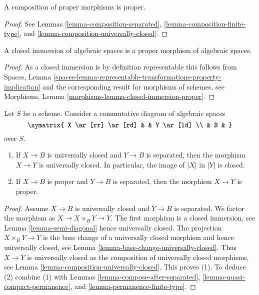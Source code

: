 \begin{lemma}
\label{lemma-composition-proper}
A composition of proper morphisms is proper.
\end{lemma}

\begin{proof}
See
Lemmas \ref{lemma-composition-separated},
\ref{lemma-composition-finite-type}, and
\ref{lemma-composition-universally-closed}.
\end{proof}

\begin{lemma}
\label{lemma-closed-immersion-proper}
A closed immersion of algebraic spaces is a proper morphism of
algebraic spaces.
\end{lemma}

\begin{proof}
As a closed immersion is by definition representable this follows from
Spaces,
Lemma \ref{spaces-lemma-representable-transformations-property-implication}
and the corresponding result for morphisms of schemes, see
Morphisms, Lemma \ref{morphisms-lemma-closed-immersion-proper}.
\end{proof}

\begin{lemma}
\label{lemma-universally-closed-permanence}
Let $S$ be a scheme.
Consider a commutative diagram of algebraic spaces
$$
\xymatrix{
X \ar[rr] \ar[rd] & &
Y \ar[ld] \\
& B &
}
$$
over $S$.
\begin{enumerate}
\item If $X \to B$ is universally closed and $Y \to B$ is
separated, then the morphism $X \to Y$ is universally closed.
In particular, the image of $|X|$ in $|Y|$ is closed.
\item If $X \to B$ is proper and $Y \to B$ is separated, then
the morphism $X \to Y$ is proper.
\end{enumerate}
\end{lemma}

\begin{proof}
Assume $X \to B$ is universally closed and $Y \to B$ is separated.
We factor the morphism as $X \to X \times_B Y \to Y$.
The first morphism is a closed immersion, see
Lemma \ref{lemma-semi-diagonal}
hence universally closed.
The projection $X \times_B Y \to Y$ is the base change
of a universally closed morphism and hence
universally closed, see
Lemma \ref{lemma-base-change-universally-closed}.
Thus $X \to Y$ is universally closed as the composition
of universally closed morphisms, see
Lemma \ref{lemma-composition-universally-closed}.
This proves (1). To deduce (2) combine (1) with
Lemmas \ref{lemma-compose-after-separated},
\ref{lemma-quasi-compact-permanence}, and
\ref{lemma-permanence-finite-type}.
\end{proof}

